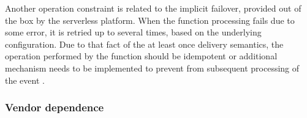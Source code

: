 Another operation constraint is related to the implicit failover, provided out of the box by the serverless platform. When the function processing fails due to some error, it is retried up to several times, based on the underlying configuration. Due to that fact of the at least once delivery semantics, the operation performed by the function should be idempotent or additional mechanism needs to be implemented to prevent from subsequent processing of the event \cite{EvaluationOfServerlessApplicationProgrammingModel}.







\subsubsection*{Vendor dependence} \label{chapter:serverless-suitability-vendor-dependence}

